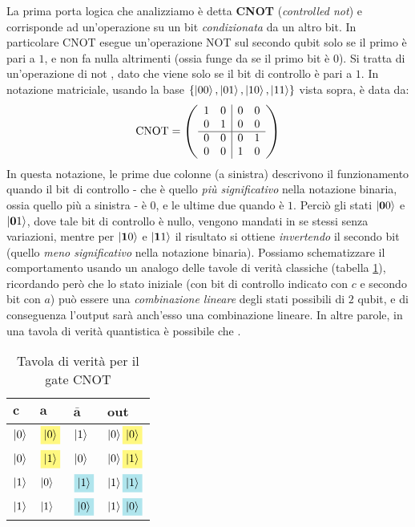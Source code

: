 \documentclass[../../InformazioneQuantistica.tex]{subfiles}
\begin{document}
La prima porta logica che analizziamo è detta \textbf{CNOT} (\textit{controlled not})  e corrisponde ad un'operazione su un bit \textit{condizionata} da un altro bit. In particolare CNOT esegue un'operazione NOT sul secondo qubit solo se il primo è pari a $1$, e non fa nulla altrimenti (ossia funge da  se il primo bit è $0$). Si tratta di un'operazione di not , dato che viene  solo se il bit di controllo è pari a $1$. In notazione matriciale, usando la base $\{\Ket{00}, \Ket{01}, \Ket{10}, \Ket{11}\}$ vista sopra, è data da:
\begin{align*}
\operatorname{CNOT} =
\left(
        \begin{array}{cc|cc}
        1 & 0 & 0 & 0 \\
        0 & 1 & 0 & 0 \\
        \hline
        0 & 0 & 0 & 1 \\
        0 & 0 & 1 & 0 \\        
        \end{array}
\right)
\end{align*}
In questa notazione, le prime due colonne (a sinistra) descrivono il funzionamento quando il bit di controllo - che è quello \textit{più significativo} nella notazione binaria, ossia quello più a sinistra - è $0$, e le ultime due quando è $1$. Perciò gli stati $\Ket{\bm{0}0}$ e $\Ket{\bm{0}1}$, dove tale bit di controllo è nullo, vengono mandati in se stessi senza variazioni, mentre per $\Ket{\bm{1}0}$ e $\Ket{\bm{1}1}$ il risultato si ottiene \textit{invertendo} il secondo bit (quello \textit{meno significativo} nella notazione binaria). Possiamo schematizzare il comportamento usando un analogo delle tavole di verità classiche (tabella \ref{tab:C-NOT}), ricordando però che lo stato iniziale (con bit di controllo indicato con $c$ e secondo bit con $a$) può essere una \textit{combinazione lineare} degli stati possibili di $2$ qubit, e di conseguenza l'output sarà anch'esso una combinazione lineare. In altre parole, in una tavola di verità quantistica è possibile che .

\begin{table}[H]
\centering
\begin{tabular}{@{}llll@{}}
\toprule
$\bm{c}$ & $\bm{a}$ & $\bm{\bar{a}}$ & \textbf{out} \\ \midrule
$\Ket{0}$ & $\hlc{Yellow}{\ket{0}}$ & $\Ket{1}$ & $\ket{0}\hlc{Yellow}{\ket{0}}$ \\
$\Ket{0}$ & $\hlc{Yellow}{\ket{1}}$ & $\Ket{0}$ & $\ket{0}\hlc{Yellow}{\ket{1}}$ \\
$\Ket{1}$ & $\Ket{0}$ & $\hlc{SkyBlue}{\ket{1}}$ & $\ket{1}\hlc{SkyBlue}{\ket{1}}$ \\
$\Ket{1}$ & $\Ket{1}$ & $\hlc{SkyBlue}{\ket{0}}$ & $\ket{1}\hlc{SkyBlue}{\ket{0}}$ \\ \bottomrule
\end{tabular}
\caption{Tavola di verità per il gate CNOT}
\label{tab:C-NOT}
\end{table}
\end{document}
